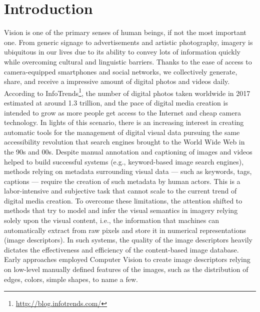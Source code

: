 
\chapter{Introduction}
\label{ch:introduction}

Vision is one of the primary senses of human beings, if not the most important one.
From generic signage to advertisements and artistic photography, imagery is ubiquitous in our lives due to its ability to convey lots of information quickly while overcoming cultural and linguistic barriers.
Thanks to the ease of access to camera-equipped smartphones and social networks, we collectively generate, share, and receive a impressive amount of digital photos and videos daily.
According to InfoTrends\footnote{\url{http://blog.infotrends.com/}}, the number of digital photos taken worldwide in 2017 estimated at around 1.3 trillion, and the pace of digital media creation is intended to grow as more people get access to the Internet and cheap camera technology.
In lights of this scenario, there is an increasing interest in creating automatic tools for the management of digital visual data pursuing the same accessibility revolution that search engines brought to the World Wide Web in the 90s and 00s.
Despite manual annotation and captioning of images and videos helped to build successful systems (e.g., keyword-based image search engines), methods relying on metadata surrounding visual data --- such as keywords, tags, captions --- require the creation of such metadata by human actors.
This is a labor-intensive and subjective task that cannot scale to the current trend of digital media creation.
To overcome these limitations, the attention shifted to methods that try to model and infer the visual semantics in imagery relying solely upon the visual content, i.e., the information that machines can automatically extract from raw pixels and store it in numerical representations (image descriptors).
In such systems, the quality of the image descriptors heavily dictates the effectiveness and efficiency of the content-based image database.
Early approaches employed Computer Vision to create image descriptors relying on low-level manually defined features of the images, such as the distribution of edges, colors, simple shapes, to name a few.
